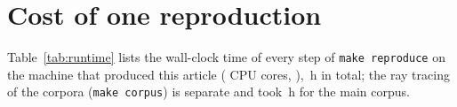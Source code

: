 \section{Cost of one reproduction}
\label{app:runtime}

Table~\ref{tab:runtime} lists the wall-clock time of every step of
\texttt{make reproduce} on the machine that produced this article
(\rtCpus{} CPU cores, \rtMachine), \rtTotalHours{}\,h in total; the ray
tracing of the corpora (\texttt{make corpus}) is separate and took
\rtHours{}\,h for the main corpus.

\begin{table}[H]
\centering
\caption{Wall-clock time of the analysis steps.}
\label{tab:runtime}
\footnotesize

\end{table}
